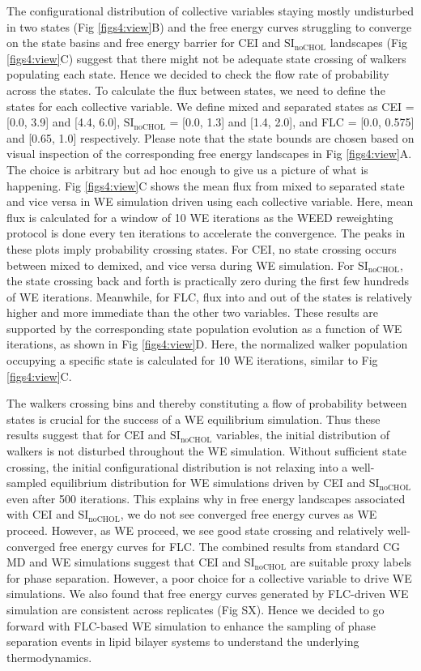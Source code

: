 \documentclass{biophys-new}
\begin{document}
The configurational distribution of collective variables staying mostly undisturbed in two states (Fig \ref{figs4:view}B) and
the free energy curves struggling to converge on the state basins and free energy barrier for CEI and $\text{SI}_{\text{noCHOL}}$ landscapes (Fig \ref{figs4:view}C) 
suggest that there might not be adequate state crossing of walkers populating each state.
Hence we decided to check the flow rate of probability across the states.
To calculate the flux between states, we need to define the states for each collective variable.
We define mixed and separated states as CEI = [0.0, 3.9] and [4.4, 6.0], $\text{SI}_{\text{noCHOL}}$ = [0.0, 1.3] and [1.4, 2.0], and FLC = [0.0, 0.575] and [0.65, 1.0] respectively.
Please note that the state bounds are chosen based on visual inspection of the corresponding free energy landscapes in Fig \ref{figs4:view}A.
The choice is arbitrary but ad hoc enough to give us a picture of what is happening. 
Fig \ref{figs4:view}C shows the mean flux from mixed to separated state and vice versa in WE simulation driven using each collective variable.
Here, mean flux is calculated for a window of 10 WE iterations as the WEED reweighting protocol is done every ten iterations to accelerate the convergence.
The peaks in these plots imply probability crossing states.
For CEI, no state crossing occurs between mixed to demixed, and vice versa during WE simulation.
For $\text{SI}_{\text{noCHOL}}$, the state crossing back and forth is practically zero during the first few hundreds of WE iterations.
Meanwhile, for FLC, flux into and out of the states is relatively higher and more immediate than the other two variables.
These results are supported by the corresponding state population evolution as a function of WE iterations, as shown in Fig \ref{figs4:view}D.
Here, the normalized walker population occupying a specific state is calculated for 10 WE iterations, similar to Fig \ref{figs4:view}C.

The walkers crossing bins and thereby constituting a flow of probability between states is crucial for the success of a WE equilibrium simulation\cite{Zuckerman2017}.
Thus these results suggest that for CEI and $\text{SI}_{\text{noCHOL}}$ variables, the initial distribution of walkers is not disturbed throughout the WE simulation.
Without sufficient state crossing, the initial configurational distribution is not relaxing into a well-sampled equilibrium distribution for WE simulations driven by CEI and $\text{SI}_{\text{noCHOL}}$ even after 500 iterations. 
This explains why in free energy landscapes associated with CEI and $\text{SI}_{\text{noCHOL}}$, we do not see converged free energy curves as WE proceed.
However, as WE proceed, we see good state crossing and relatively well-converged free energy curves for FLC. 
The combined results from standard CG MD and WE simulations suggest that CEI and $\text{SI}_{\text{noCHOL}}$ are suitable proxy labels for phase separation. However, a poor choice for a collective variable to drive WE simulations.
We also found that free energy curves generated by FLC-driven WE simulation are consistent across replicates (Fig SX).
Hence we decided to go forward with FLC-based WE simulation to enhance the sampling of phase separation events in lipid bilayer systems to understand the underlying thermodynamics.
\\ 
\end{document}
